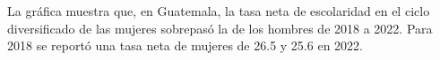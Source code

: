 La gráfica muestra que, en Guatemala, la tasa neta de escolaridad en el ciclo diversificado
de las mujeres sobrepasó la de los hombres de 2018 a 2022. Para 2018 se reportó una tasa neta de mujeres de 26.5 y 25.6 en 2022.